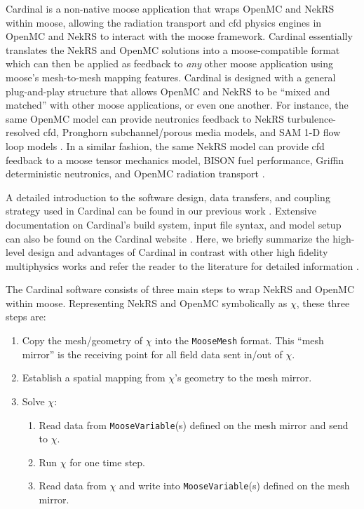 \documentclass[3p,,preprint,11pt]{elsarticle}
\begin{document}
Cardinal is a non-native \gls{moose} application that wraps OpenMC and NekRS within \gls{moose}, allowing the radiation transport and \gls{cfd} physics engines in OpenMC and NekRS to interact with the \gls{moose} framework. Cardinal essentially translates the NekRS and OpenMC solutions into a \gls{moose}-compatible format which can then be applied as feedback to {\it any} other \gls{moose} application using \gls{moose}'s mesh-to-mesh mapping features. Cardinal is designed with a general plug-and-play structure that allows OpenMC and NekRS to be ``mixed and matched'' with other \gls{moose} applications, or even one another. 
For instance, the same OpenMC model can provide neutronics feedback to NekRS turbulence-resolved \gls{cfd}, Pronghorn subchannel/porous media models, and SAM 1-D flow loop models \cite{nekrs,novak_manual_2020,hu}. In a similar fashion, the same NekRS model can provide \gls{cfd} feedback to a \gls{moose} tensor mechanics model, BISON fuel performance, Griffin deterministic neutronics, and OpenMC radiation transport \cite{bison,openmc}. 

A detailed introduction to the software design, data transfers, and coupling strategy used in Cardinal can be found in our previous work \cite{novak2022_cardinal}. Extensive documentation on Cardinal's build system, input file syntax, and model setup can also be found on the Cardinal website \cite{cardinal_website}. Here, we briefly summarize the high-level design and advantages of Cardinal in contrast with other high fidelity multiphysics works and refer the reader to the literature for detailed information \cite{novak2022_cardinal}.

The Cardinal software consists of three main steps to wrap NekRS and OpenMC within \gls{moose}. Representing NekRS and OpenMC symbolically as $\chi$, these three steps are:

\begin{enumerate}
\item Copy the mesh/geometry of $\chi$ into the {\tt MooseMesh} format.
This ``mesh mirror'' is the receiving point for all field data sent in/out of $\chi$.
\item Establish a spatial mapping from $\chi$'s geometry to the mesh mirror.
\item Solve $\chi$:
  \begin{enumerate}
  \item Read data from {\tt MooseVariable}(s) defined on the mesh mirror and send to $\chi$.
  \item Run $\chi$ for one time step.
  \item Read data from $\chi$ and write into {\tt MooseVariable}(s) defined on the mesh mirror.
  \end{enumerate}
\end{enumerate}
\end{document}
